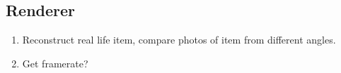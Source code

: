 \subsection{Renderer}
\begin{enumerate}
	\item Reconstruct real life item, compare photos of item from different angles. 
	\item Get framerate?
\end{enumerate}